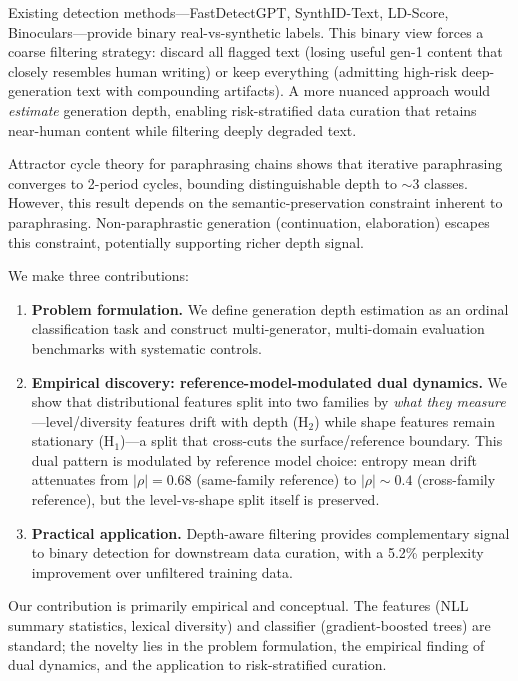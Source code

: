 \documentclass[letterpaper]{article}
\begin{document}
Existing detection methods---FastDetectGPT, SynthID-Text, LD-Score, Binoculars---provide binary real-vs-synthetic labels.
This binary view forces a coarse filtering strategy: discard all flagged text (losing useful gen-1 content that closely resembles human writing) or keep everything (admitting high-risk deep-generation text with compounding artifacts).
A more nuanced approach would \emph{estimate} generation depth, enabling risk-stratified data curation that retains near-human content while filtering deeply degraded text.

Attractor cycle theory for paraphrasing chains shows that iterative paraphrasing converges to 2-period cycles, bounding distinguishable depth to ${\sim}$3 classes.
However, this result depends on the semantic-preservation constraint inherent to paraphrasing.
Non-paraphrastic generation (continuation, elaboration) escapes this constraint, potentially supporting richer depth signal.

We make three contributions:

\begin{enumerate}
\item \textbf{Problem formulation.} We define generation depth estimation as an ordinal classification task and construct multi-generator, multi-domain evaluation benchmarks with systematic controls.

\item \textbf{Empirical discovery: reference-model-modulated dual dynamics.} We show that distributional features split into two families by \emph{what they measure}---level/diversity features drift with depth (H$_2$) while shape features remain stationary (H$_1$)---a split that cross-cuts the surface/reference boundary. This dual pattern is modulated by reference model choice: entropy mean drift attenuates from $|\rho|{=}0.68$ (same-family reference) to $|\rho|{\sim}0.4$ (cross-family reference), but the level-vs-shape split itself is preserved.

\item \textbf{Practical application.} Depth-aware filtering provides complementary signal to binary detection for downstream data curation, with a 5.2\% perplexity improvement over unfiltered training data.
\end{enumerate}

Our contribution is primarily empirical and conceptual.
The features (NLL summary statistics, lexical diversity) and classifier (gradient-boosted trees) are standard; the novelty lies in the problem formulation, the empirical finding of dual dynamics, and the application to risk-stratified curation.
\end{document}
